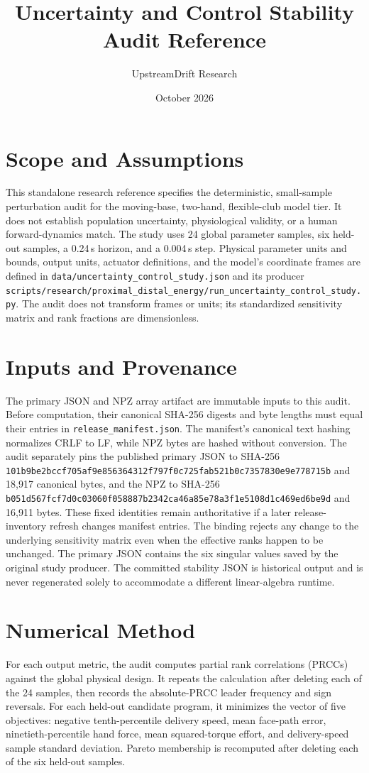 \documentclass[11pt]{article}
\title{Uncertainty and Control Stability Audit Reference}
\author{UpstreamDrift Research}
\date{October 2026}
\begin{document}
\maketitle

\section{Scope and Assumptions}
This standalone research reference specifies the deterministic, small-sample
perturbation audit for the moving-base, two-hand, flexible-club model tier. It
does not establish population uncertainty, physiological validity, or a human
forward-dynamics match. The study uses 24 global parameter samples, six held-out
samples, a 0.24\,s horizon, and a 0.004\,s step. Physical parameter units and
bounds, output units, actuator definitions, and the model's coordinate frames
are defined in \texttt{data/uncertainty\_control\_study.json} and its producer
\texttt{scripts/research/proximal\_distal\_energy/run\_uncertainty\_control\_study.py}.
The audit does not transform frames or units; its standardized sensitivity
matrix and rank fractions are dimensionless.

\section{Inputs and Provenance}
The primary JSON and NPZ array artifact are immutable inputs to this audit.
Before computation, their canonical SHA-256 digests and byte lengths must equal
their entries in \texttt{release\_manifest.json}. The manifest's canonical text
hashing normalizes CRLF to LF, while NPZ bytes are hashed without conversion.
The audit separately pins the published primary JSON to SHA-256
\texttt{101b9be2bccf705af9e856364312f797f0c725fab521b0c7357830e9e778715b}
and 18,917 canonical bytes, and the NPZ to SHA-256
\texttt{b051d567fcf7d0c03060f058887b2342ca46a85e78a3f1e5108d1c469ed6be9d}
and 16,911 bytes. These fixed identities remain authoritative if a later
release-inventory refresh changes manifest entries. The binding rejects any
change to the underlying sensitivity matrix even when the effective ranks
happen to be unchanged. The primary JSON contains the six
singular values saved by the original study producer. The committed stability
JSON is historical output and is never regenerated solely to accommodate a
different linear-algebra runtime.

\section{Numerical Method}
For each output metric, the audit computes partial rank correlations (PRCCs)
against the global physical design. It repeats the calculation after deleting
each of the 24 samples, then records the absolute-PRCC leader frequency and
sign reversals. For each held-out candidate program, it minimizes the vector
of five objectives: negative tenth-percentile delivery speed, mean face-path
error, ninetieth-percentile hand force, mean squared-torque effort, and
delivery-speed sample standard deviation. Pareto membership is recomputed after
deleting each of the six held-out samples.
\end{document}
